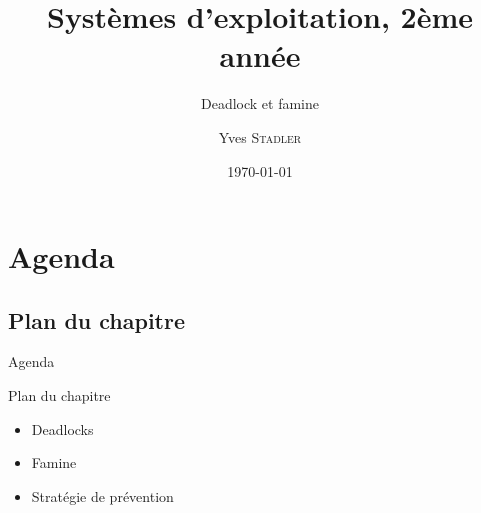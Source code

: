 
\title{Systèmes d'exploitation, 2ème année}
\subtitle{Deadlock et famine}

\author{Yves \textsc{Stadler}}

\date{\today}




\begin{frame}
\titlepage
\end{frame}

\def\sectitle{Agenda}
\section{\sectitle}
\def\subsectitle{Plan du chapitre}
\subsection{\subsectitle}

\begin{frame}{\sectitle}
\begin{block}{\subsectitle}
\begin{itemize}
\item Deadlocks
\item Famine
\item Stratégie de prévention
\end{itemize}
\end{block}
\end{frame}


\def\sectitle{Deadlock}
